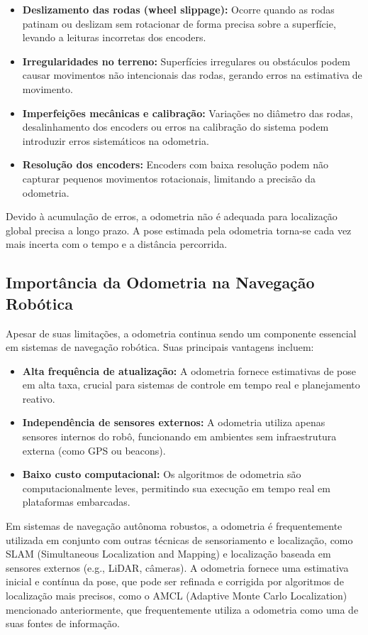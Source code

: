 \begin{itemize}
    \item \textbf{Deslizamento das rodas (wheel slippage):} Ocorre quando as rodas patinam ou deslizam sem rotacionar de forma precisa sobre a superfície, levando a leituras incorretas dos encoders.
    \item \textbf{Irregularidades no terreno:} Superfícies irregulares ou obstáculos podem causar movimentos não intencionais das rodas, gerando erros na estimativa de movimento.
    \item \textbf{Imperfeições mecânicas e calibração:} Variações no diâmetro das rodas, desalinhamento dos encoders ou erros na calibração do sistema podem introduzir erros sistemáticos na odometria.
    \item \textbf{Resolução dos encoders:} Encoders com baixa resolução podem não capturar pequenos movimentos rotacionais, limitando a precisão da odometria.
\end{itemize}

Devido à acumulação de erros, a odometria não é adequada para localização
global precisa a longo prazo. A pose estimada pela odometria torna-se cada vez
mais incerta com o tempo e a distância percorrida.

\subsection{Importância da Odometria na Navegação Robótica}

Apesar de suas limitações, a odometria continua sendo um componente essencial
em sistemas de navegação robótica. Suas principais vantagens incluem:

\begin{itemize}
    \item \textbf{Alta frequência de atualização:} A odometria fornece estimativas de pose em alta taxa, crucial para sistemas de controle em tempo real e planejamento reativo.
    \item \textbf{Independência de sensores externos:} A odometria utiliza apenas sensores internos do robô, funcionando em ambientes sem infraestrutura externa (como GPS ou beacons).
    \item \textbf{Baixo custo computacional:} Os algoritmos de odometria são computacionalmente leves, permitindo sua execução em tempo real em plataformas embarcadas.
\end{itemize}

Em sistemas de navegação autônoma robustos, a odometria é frequentemente
utilizada em conjunto com outras técnicas de sensoriamento e localização, como
SLAM (Simultaneous Localization and Mapping) e localização baseada em sensores
externos (e.g., LiDAR, câmeras). A odometria fornece uma estimativa inicial e
contínua da pose, que pode ser refinada e corrigida por algoritmos de
localização mais precisos, como o AMCL (Adaptive Monte Carlo Localization)
mencionado anteriormente, que frequentemente utiliza a odometria como uma de
suas fontes de informação.

